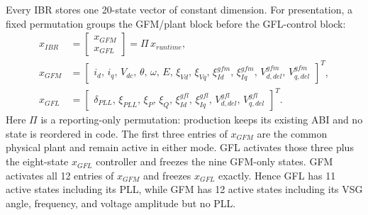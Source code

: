 \documentclass[12pt,a4paper]{article}
\begin{document}
Every IBR stores one 20-state vector of constant dimension. For presentation, a fixed permutation
groups the GFM/plant block before the GFL-control block:
\begin{align}
x_{IBR}&=\begin{bmatrix}x_{GFM}\\ x_{GFL}\end{bmatrix}
=\Pi\,x_{runtime},
\label{eq:xibr}\\[4pt]
x_{GFM}&=\begin{bmatrix}i_d,\,i_q,\,V_{dc},\,\theta,\,\omega,\,E,\,
\xi_{Vd},\,\xi_{Vq},\,\xi_{Id}^{gfm},\,\xi_{Iq}^{gfm},\,
V_{d,del}^{gfm},\,V_{q,del}^{gfm}\end{bmatrix}^{\!T},
\label{eq:xgfm}\\[4pt]
x_{GFL}&=\begin{bmatrix}\delta_{PLL},\,\xi_{PLL},\,\xi_P,\,\xi_Q,\,
\xi_{Id}^{gfl},\,\xi_{Iq}^{gfl},\,V_{d,del}^{gfl},\,V_{q,del}^{gfl}\end{bmatrix}^{\!T}.
\label{eq:xgfl}
\end{align}
Here $\Pi$ is a reporting-only permutation: production keeps its existing ABI and no state is
reordered in code. The first three entries of $x_{GFM}$ are the common physical plant and remain
active in either mode. GFL activates those three plus the eight-state $x_{GFL}$ controller and
freezes the nine GFM-only states. GFM activates all 12 entries of $x_{GFM}$ and freezes
$x_{GFL}$ exactly. Hence GFL has 11 active states including its PLL, while GFM has 12 active
states including its VSG angle, frequency, and voltage amplitude but no PLL.
\end{document}
